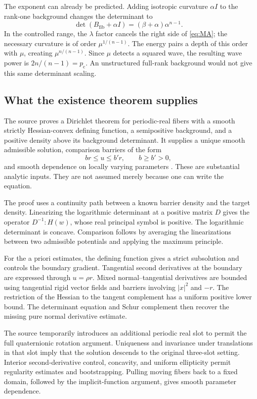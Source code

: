 \documentclass[11pt,a4paper]{article}
\numberwithin{equation}{section}
\theoremstyle{definition}
\theoremstyle{remark}
\newcommand{\pc}{p_{\mathrm c}}
\begin{document}
The exponent can already be predicted. Adding isotropic curvature $\alpha I$
to the rank-one background changes the determinant to
\begin{equation}\label{eq:rankone}
 \det(B_{\mathrm{fib}}+\alpha I)=(\beta+\alpha)\alpha^{n-1}.
\end{equation}
In the controlled range, the $\lambda$ factor cancels the right side of
\eqref{eq:MA}; the necessary curvature is of order $\mu^{1/(n-1)}$.
The energy pairs a depth of this order with $\mu$, creating
$\mu^{n/(n-1)}$. Since $\mu$ detects a squared wave, the resulting wave
power is $2n/(n-1)=\pc$. An unstructured full-rank background would not give
this same determinant scaling.

\subsection{What the existence theorem supplies}
The source proves a Dirichlet theorem for periodic-real fibers with a smooth
strictly Hessian-convex defining function, a semipositive background, and a
positive density above its background determinant. It supplies a unique smooth
admissible solution, comparison barriers of the form
\[
 b r\le u\le b' r,\qquad b\ge b'>0,
\]
and smooth dependence on locally varying parameters \cite{dirichlet}.
These are substantial analytic inputs. They are not assumed merely because
one can write the equation.

The proof uses a continuity path between a known barrier density and the target
density. Linearizing the logarithmic determinant at a positive matrix $D$
gives the operator $D^{-1}:H(w)$, whose real principal symbol is positive.
The logarithmic determinant is concave. Comparison follows by averaging the
linearizations between two admissible potentials and applying the maximum
principle.

For the a priori estimates, the defining function gives a strict subsolution
and controls the boundary gradient. Tangential second derivatives at the
boundary are expressed through $u=\rho r$. Mixed normal--tangential derivatives
are bounded using tangential rigid vector fields and barriers involving
$|x|^2$ and $-r$. The restriction of the Hessian to the tangent complement has
a uniform positive lower bound. The determinant equation and Schur complement
then recover the missing pure normal derivative estimate.

The source temporarily introduces an additional periodic real slot to permit
the full quaternionic rotation argument. Uniqueness and invariance under
translations in that slot imply that the solution descends to the original
three-slot setting. Interior second-derivative control, concavity, and uniform
ellipticity permit regularity estimates and bootstrapping. Pulling moving
fibers back to a fixed domain, followed by the implicit-function argument,
gives smooth parameter dependence.
\end{document}
